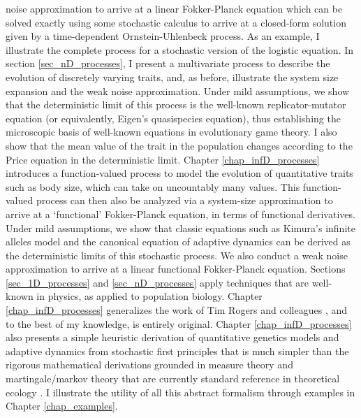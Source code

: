 noise approximation to arrive at a linear Fokker-Planck equation which can be solved exactly using some stochastic calculus to arrive at a closed-form solution given by a time-dependent Ornstein-Uhlenbeck process. As an example, I illustrate the complete process for a stochastic version of the logistic equation. In section \ref{sec_nD_processes}, I present a multivariate process to describe the evolution of discretely varying traits, and, as before, illustrate the system size expansion and the weak noise approximation. Under mild assumptions, we show that the deterministic limit of this process is the well-known replicator-mutator equation (or equivalently, Eigen's quasispecies equation), thus establishing the microscopic basis of well-known equations in evolutionary game theory. I also show that the mean value of the trait in the population changes according to the Price equation in the deterministic limit. Chapter \ref{chap_infD_processes} introduces a function-valued process to model the evolution of quantitative traits such as body size, which can take on uncountably many values. This function-valued process can then also be analyzed via a system-size approximation to arrive at a `functional' Fokker-Planck equation, in terms of functional derivatives. Under mild assumptions, we show that classic equations such as Kimura's infinite alleles model and the canonical equation of adaptive dynamics can be derived as the deterministic limits of this stochastic process. We also conduct a weak noise approximation to arrive at a linear functional Fokker-Planck equation.  Sections \ref{sec_1D_processes} and \ref{sec_nD_processes} apply techniques that are well-known in physics, as applied to population biology. Chapter \ref{chap_infD_processes} generalizes the work of Tim Rogers and colleagues \citep{rogers_demographic_2012,rogers_spontaneous_2012,rogers_modes_2015}, and to the best of my knowledge, is entirely original. Chapter \ref{chap_infD_processes} also presents a simple heuristic derivation of quantitative genetics models and adaptive dynamics from stochastic first principles that is much simpler than the rigorous mathematical derivations grounded in measure theory and martingale/markov theory that are currently standard reference in theoretical ecology \citep{champagnat_individual_2008}. I illustrate the utility of all this abstract formalism through examples in Chapter \ref{chap_examples}.

